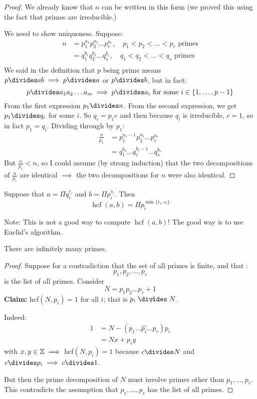 \documentclass[twoside]{scrartcl}
\DeclareMathOperator{\hcf}{hcf}
\begin{document}
\begin{proof}
We already know that $n$ can be written in this form (we proved this using the fact that primes are irreducible.) 

We need to show uniqueness. Suppose: 
\[
\begin{aligned}
  n &= p_1^{a_1}p_2^{a_2}\dots p_r^{a_r}, \quad p_1<p_2<\dots < p_r \text{ primes}\\
  &= q_1^{b_1}q_2^{b_2}\dots q_s^{b_s}, \quad q_1<q_2<\dots < q_s \text{ primes}\\
\end{aligned}
\]
We said in the definition that $p$ being prime means $p \divides ab \implies p \divides a$ or $p \divides b$, but in fact: 
\[p \divides a_1a_2\dots a_m \implies p \divides a_i \text{ for some }i \in \{1,\dots,p-1\}\]
From the first expression $p_1 \divides n$. From the second expression, we get $p_1 \divides q_i$ for some $i$. So $q_i = p_1c$ and then because $q_i$ is irreducible, $c = 1$, so in fact $p_1 = q_i$. Dividing through by $p_1$:
\[
\begin{aligned}
  \frac{n}{p_1} &= p_1^{a_1 -1}p_2^{a_2}\dots p_r^{a_r}\\
  &= q_1^{b_1} \dots q_i^{b_i -1}\dots q_s^{b_s}
\end{aligned}
\]
But $\frac{n}{p_1} < n$, so I could assume (by strong induction) that the two decompositions of $\frac{n}{p_1}$ are identical $\implies$ the two decompositions for $n$ were also identical. 
\end{proof}

\begin{corollary}
Suppose that $a = \Pi q_i^{r_i}$ and $b = \Pi p_i^{s_i}$. Then 
\[\hcf(a,b) = \Pi p_i^{\min\{r_i,s_i\}}\]	
\end{corollary}

Note: This is not a good way to compute $\hcf(a,b)$! The good way is to use Euclid's algorithm.\\


\begin{theorem}[Euclid]
There are infinitely many primes.
\end{theorem}

\begin{proof}
Suppose for a contradiction that the set of all primes is finite, and that :
\[p_1,p_2,\dots,p_r\]	
is the list of all primes. Consider 
\[N = p_1p_2\dots p_r + 1\]
\textbf{Claim:} hcf$(N,p_i) =1$ for all $i$; that is $p_i \centernot\divides N$.

Indeed:
\[
\begin{aligned}
  1 &= N - (p_1\dots \hat{p_i}\dots p_r)p_i\\
  &= Nx + p_iy
\end{aligned}
\]
with $x,y \in\mathbb{Z} \implies $ hcf$(N,p_i) = 1$ because $c \divides N$ and $c \divides p_i \implies c \divides 1$. 

But then the prime decomposition of $N$ must involve primes other than $p_1,\dots,p_r$. This contradicts the assumption that $p_1,\dots,p_r$ has the list of all primes.
\end{proof}
\end{document}
